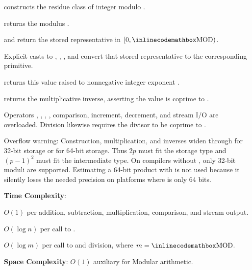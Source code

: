 \begin{compactitem}
  \item {} constructs the residue class of integer  modulo .
  \item {} returns the modulus .
  \item {} and  return the stored representative in $[0, {\inlinecodemath{MOD}})$.
  \item Explicit casts to , , , and  convert that stored representative to the corresponding primitive.
  \item {} returns this value raised to nonnegative integer exponent .
  \item {} returns the multiplicative inverse, asserting the value is coprime to .
  \item Operators \inlinecode{+}, \inlinecode{-}, \inlinecode{*}, \inlinecode{/}, comparison, increment, decrement, and stream I/O are overloaded. Division likewise requires the divisor to be coprime to .
\end{compactitem}

Overflow warning: Construction, multiplication, and inverses widen through  for 32-bit storage or  for 64-bit storage. Thus $2p$ must fit the storage type and $(p - 1)^2$ must fit the intermediate type. On compilers without , only 32-bit moduli are supported. Estimating a 64-bit product with  is not used because it silently loses the needed precision on platforms where  is only 64 bits.

\textbf{Time Complexity}:
\begin{compactitem}
  \item $O(1)$ per addition, subtraction, multiplication, comparison, and stream output.
  \item $O(\log n)$ per call to .
  \item $O(\log m)$ per call to  and division, where $m = {\inlinecodemath{MOD}}$.
\end{compactitem}

\textbf{Space Complexity}: $O(1)$ auxiliary for Modular arithmetic.


